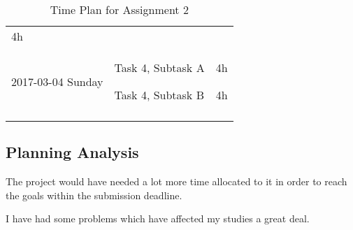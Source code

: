 \begin{longtable}[c]{@{}lll@{}}
\begin{minipage}[t]{0.32\columnwidth}
4h
\strut\end{minipage}\tabularnewline
\begin{minipage}[t]{0.28\columnwidth}\raggedright\strut
2017-03-04 Sunday
\strut\end{minipage} &
\begin{minipage}[t]{0.25\columnwidth}\raggedright\strut
Task 4, Subtask A

Task 4, Subtask B
\strut\end{minipage} &
\begin{minipage}[t]{0.32\columnwidth}\raggedright\strut
4h

4h
\strut\end{minipage}\tabularnewline
\bottomrule
  \caption{Time Plan for Assignment 2}
  \label{table-timeplan}
\end{longtable}




\subsection{Planning Analysis}
The project would have needed a lot more time allocated to it in order to reach
the goals within the submission deadline.

I have had some problems which have affected my studies a great deal.


% 
% 
% 
%     
% 
% 
